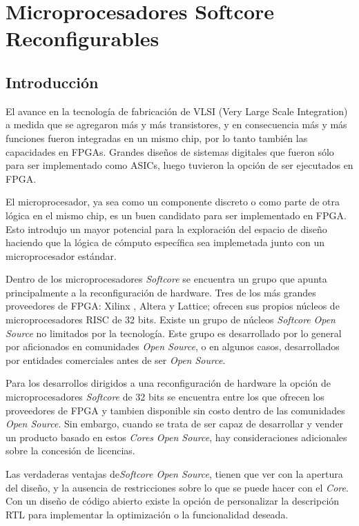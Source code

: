 \section{Microprocesadores Softcore Reconfigurables}
	\subsection{Introducción}
	El avance en la tecnología de fabricación de VLSI (Very Large Scale Integration) a medida que se agregaron más y más transistores, y en
	consecuencia más y más funciones fueron integradas en un mismo chip, por lo tanto también las capacidades en FPGAs. Grandes diseños de sistemas
	digitales que fueron sólo para ser implementado como ASICs, luego tuvieron la opción de ser ejecutados en FPGA.
	
	El microprocesador, ya sea como un componente discreto o como parte de otra lógica en el mismo chip, es un buen candidato para ser implementado en
	FPGA. Esto introdujo un mayor potencial para la exploración del espacio de diseño haciendo que la lógica de cómputo específica sea implemetada junto
	con un microprocesador estándar. \cite{Etiqueta05}
	
	Dentro de los microprocesadores \textit{Softcore} se encuentra un grupo que apunta principalmente a la reconfiguración de hardware.
	Tres de los más grandes proveedores de FPGA: Xilinx , Altera y Lattice; ofrecen sus propios núcleos de microprocesadores RISC de 32 bits.
	Existe un grupo de núcleos \textit{Softcore} \textit{Open Source} no limitados por la tecnología. Este grupo es desarrollado por
	lo general por aficionados en comunidades \textit{Open Source}, o en algunos casos, desarrollados por entidades comerciales antes de ser \textit{Open
	Source}.
	
	Para los desarrollos dirigidos a una reconfiguración de hardware la opción de microprocesadores \textit{Softcore} de 32 bits se
 	encuentra entre los que ofrecen los proveedores de FPGA y tambien disponible sin costo dentro de las comunidades \textit{Open Source}. Sin embargo,
 	cuando se trata de ser capaz de desarrollar y vender un producto basado en estos \textit{Cores} \textit{Open Source}, hay consideraciones
 	adicionales sobre la concesión de licencias.
	
	Las verdaderas ventajas de\textit{Softcore Open Source}, tienen que ver con la apertura del diseño, y la ausencia de restricciones sobre lo que se
	puede hacer con el \textit{Core}. Con un diseño de código abierto existe la opción de personalizar la descripción RTL para implementar la
	optimización o la funcionalidad deseada.
	
